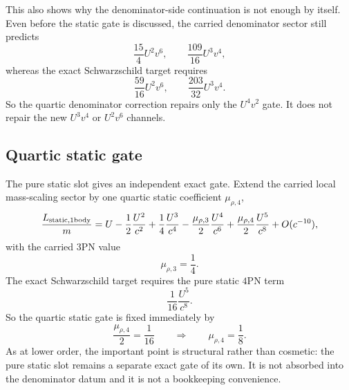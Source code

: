 \documentclass[11pt]{article}
\begin{document}
This also shows why the denominator-side continuation is not enough by itself.
Even before the static gate is discussed, the carried denominator sector still
predicts
\begin{equation}
\frac{15}{4}U^2v^6,
\qquad
\frac{109}{16}U^3v^4,
\label{eq:app-4pn-onebody-repair-denominator-mispredictions}
\end{equation}
whereas the exact Schwarzschild target requires
\begin{equation}
\frac{59}{16}U^2v^6,
\qquad
\frac{203}{32}U^3v^4.
\label{eq:app-4pn-onebody-repair-denominator-targets}
\end{equation}
So the quartic denominator correction repairs only the $U^4v^2$ gate.  It does
not repair the new $U^3v^4$ or $U^2v^6$ channels.

\subsection{Quartic static gate}
\label{app:onebody-repair-static}

The pure static slot gives an independent exact gate.  Extend the carried local
mass-scaling sector by one quartic static coefficient $\mu_{\rho,4}$,
\begin{equation}
\frac{L_{\rm static,1body}}{m}
=
U-\frac12\frac{U^2}{c^2}+\frac14\frac{U^3}{c^4}
-\frac{\mu_{\rho,3}}{2}\frac{U^4}{c^6}
+\frac{\mu_{\rho,4}}{2}\frac{U^5}{c^8}
+O(c^{-10}),
\label{eq:app-4pn-onebody-repair-static-sector}
\end{equation}
with the carried $3$PN value
\begin{equation}
\boxed{\mu_{\rho,3}=\frac14.}
\label{eq:app-4pn-onebody-repair-murho3-carried}
\end{equation}
The exact Schwarzschild target requires the pure static $4$PN term
\begin{equation}
\frac1{16}\frac{U^5}{c^8}.
\label{eq:app-4pn-onebody-repair-static-target}
\end{equation}
So the quartic static gate is fixed immediately by
\begin{equation}
\frac{\mu_{\rho,4}}{2}=\frac1{16}
\qquad\Longrightarrow\qquad
\boxed{\mu_{\rho,4}=\frac18.}
\label{eq:app-4pn-onebody-repair-murho4}
\end{equation}
As at lower order, the important point is structural rather than cosmetic: the
pure static slot remains a separate exact gate of its own.  It is not absorbed
into the denominator datum and it is not a bookkeeping convenience.
\end{document}
